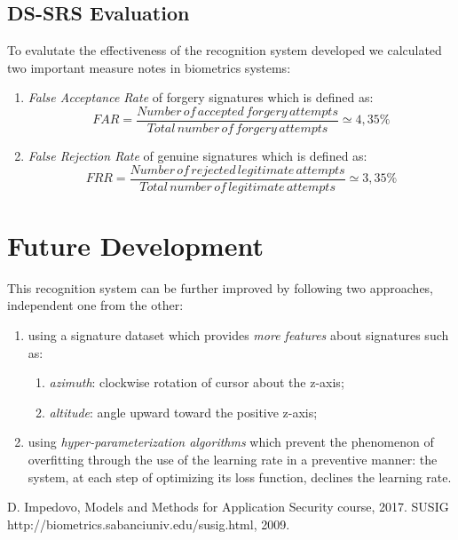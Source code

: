 \documentclass[a4paper, 10pt, conference]{IEEEconf}
\begin{document}
\subsection{DS-SRS Evaluation}
To evalutate the effectiveness of the recognition system developed we calculated two important measure notes in biometrics systems:
	\begin{enumerate}[label=(\roman*)]
    	\item 
    		\textit{False Acceptance Rate} of forgery signatures which is defined as: \newline
\[ FAR = \frac{Number\,of\,accepted\,forgery\,attempts}{Total\,number\,of\,forgery\,attempts} \simeq 4,35\% \]
      	\item 
      		\textit{False Rejection Rate} of genuine signatures which is defined as: \newline
\[ FRR = \frac{Number\,of\,rejected\,legitimate\,attempts}{Total\,number\,of\,legitimate\,attempts} \simeq 3,35\% \]
	\end{enumerate}

\section{Future Development}
This recognition system can be further improved by following two approaches, independent one from the other:
	\begin{enumerate}[label=(\roman*)]
    	\item
    		using a signature dataset which provides \textit{more features} about signatures such as:
    	\begin{enumerate}[label=(\roman*)]
      		\item
      			\textit{azimuth}: clockwise rotation of cursor about the z-axis;
      		\item
      			\textit{altitude}: angle upward toward the positive z-axis;
    	\end{enumerate}
    	\item
    		using \textit{hyper-parameterization algorithms} which prevent the phenomenon of overfitting 
    		through the use of the learning rate in a preventive manner: the system, at each step of 
    		optimizing its loss function, declines the learning rate.
	\end{enumerate}

\begin{thebibliography}{99}
 D. Impedovo, Models and Methods for Application Security course, 2017.
 SUSIG http://biometrics.sabanciuniv.edu/susig.html, 2009.
\end{thebibliography}
\end{document}
